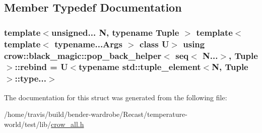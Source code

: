 \subsection{Member Typedef Documentation}
\hypertarget{structcrow_1_1black__magic_1_1pop__back__helper_3_01seq_3_01_n_8_8_8_4_00_01_tuple_01_4_a6d301c081b79ce4ee16aac8e87e6a978}{
\subsubsection[{rebind}]{\setlength{\rightskip}{0pt plus 5cm}template$<$unsigned... N, typename Tuple $>$ template$<$template$<$ typename...\-Args $>$ class U$>$ using {\bf crow\-::black\-\_\-magic\-::pop\-\_\-back\-\_\-helper}$<$ {\bf seq}$<$ N...$>$, Tuple $>$\-::{\bf rebind} =  U$<$typename std\-::tuple\-\_\-element$<$N, Tuple$>$\-::type...$>$}}\label{structcrow_1_1black__magic_1_1pop__back__helper_3_01seq_3_01_n_8_8_8_4_00_01_tuple_01_4_a6d301c081b79ce4ee16aac8e87e6a978}


The documentation for this struct was generated from the following file\-:\begin{DoxyCompactItemize}
\item 
/home/travis/build/bender-\/wardrobe/\-Recast/temperature-\/world/test/lib/\hyperlink{crow__all_8h}{crow\-\_\-all.\-h}\end{DoxyCompactItemize}
